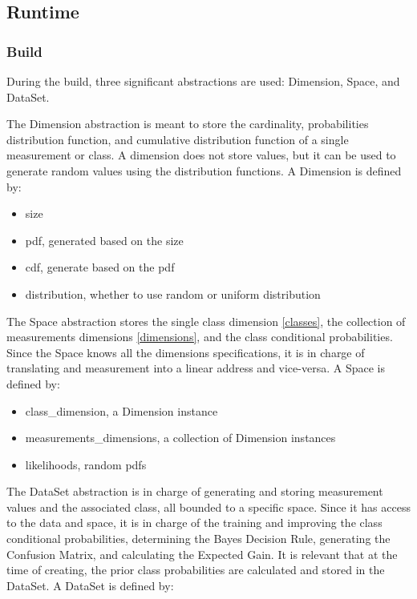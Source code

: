 \documentclass[letterpaper, conference]{IEEEtran}
\begin{document}
\subsection{Runtime}

\subsubsection{Build}

During the build, three significant abstractions are used: Dimension, Space, and DataSet.

The Dimension abstraction is meant to store the cardinality, probabilities distribution function, and cumulative distribution function of a single measurement or class. A dimension does not store values, but it can be used to generate random values using the distribution functions. A Dimension is defined by:

\begin{itemize}
  \item size
  \item pdf, generated based on the size
  \item cdf, generate based on the pdf
  \item distribution, whether to use random or uniform distribution
\end{itemize}

The Space abstraction stores the single class dimension \ref{classes}, the collection of measurements dimensions \ref{dimensions}, and the class conditional probabilities. Since the Space knows all the dimensions specifications, it is in charge of translating and measurement into a linear address and vice-versa. A Space is defined by:

\begin{itemize}
\item class\_dimension, a Dimension instance
\item measurements\_dimensions, a collection of Dimension instances
\item likelihoods, random pdfs
\end{itemize}

The DataSet abstraction is in charge of generating and storing measurement values and the associated class, all bounded to a specific space. Since it has access to the data and space, it is in charge of the training and improving the class conditional probabilities, determining the Bayes Decision Rule, generating the Confusion Matrix, and calculating the Expected Gain. It is relevant that at the time of creating, the prior class probabilities are calculated and stored in the DataSet. A DataSet is defined by:
    
\end{document}
